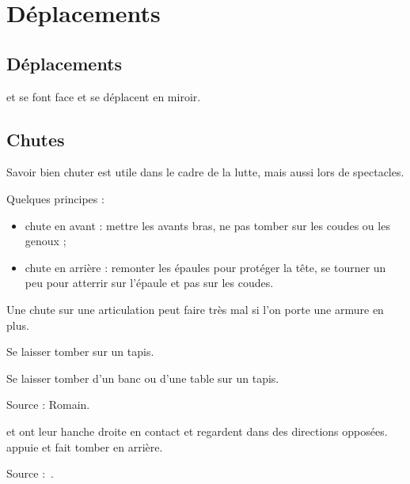 \chapter{Déplacements}


\section{Déplacements}



\begin{exercice}
\label{ex:general:miroir}

\A et \D se font face et se déplacent en miroir.
\end{exercice}


\section{Chutes}

Savoir bien chuter est utile dans le cadre de la lutte, mais aussi lors de spectacles.

Quelques principes :
\begin{itemize}
	\item chute en avant : mettre les avants bras, ne pas tomber sur les coudes ou les genoux ;
	\item chute en arrière : remonter les épaules pour protéger la tête, se tourner un peu pour atterrir sur l'épaule et pas sur les coudes.
\end{itemize}
Une chute sur une articulation peut faire très mal si l'on porte une armure en plus.


\begin{exercice}[Chute]

Se laisser tomber sur un tapis.

\end{exercice}


\begin{exercice}

Se laisser tomber d'un banc ou d'une table sur un tapis.

Source : Romain.

\end{exercice}


\begin{exercice}
\A et \D ont leur hanche droite en contact et regardent dans des directions opposées.
\A appuie et fait tomber \D en arrière.

Source :~\cite{petit:dijon:close_longword:2015}.
\end{exercice}


